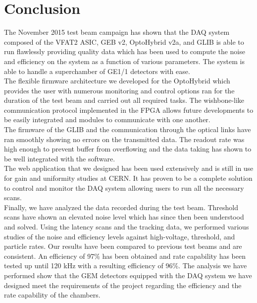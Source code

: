   \section{Conclusion}

    The November 2015 test beam campaign has shown that the DAQ system composed of the VFAT2 ASIC, GEB v2, OptoHybrid v2a, and GLIB is able to run flawlessly providing quality data which has been used to compute the noise and efficiency on the system as a function of various parameters. The system is able to handle a superchamber of GE1/1 detectors with ease. \\

    The flexible firmware architecture we developed for the OptoHybrid which provides the user with numerous monitoring and control options ran for the duration of the test beam and carried out all required tasks. The wishbone-like communication protocol implemented in the FPGA allows future developments to be easily integrated and modules to communicate with one another. \\

    The firmware of the GLIB and the communication through the optical links have ran smoothly showing no errors on the transmitted data. The readout rate was high enough to prevent buffer from overflowing and the data taking has shown to be well integrated with the software. \\

    The web application that we designed has been used extensively and is still in use for gain and uniformity studies at CERN. It has proven to be a complete solution to control and monitor the DAQ system allowing users to run all the necessary scans. \\

    Finally, we have analyzed the data recorded during the test beam. Threshold scans have shown an elevated noise level which has since then been understood and solved. Using the latency scans and the tracking data, we performed various studies of the noise and efficiency levels against high-voltage, threshold, and particle rates. Our results have been compared to previous test beams and are consistent. An efficiency of 97\% has been obtained and rate capability has been tested up until 120 kHz with a resulting efficiency of 96\%. The analysis we have performed show that the GEM detectors equipped with the DAQ system we have designed meet the requirements of the project regarding the efficiency and the rate capability of the chambers.
